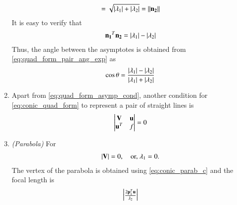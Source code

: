 \begin{enumerate}[label=\thesubsection.\arabic*.,ref=\thesubsection.\theenumi]
\begin{align}
=\sqrt{\left\vert\lambda_1\right\vert+\left\vert\lambda_2\right\vert} = \left\lVert\mathbf{n_2}\right\rVert
\end{align} 
It is easy to verify that 
\begin{align} 
\mathbf{n_1}^T\mathbf{n_2} = \left\vert\lambda_1\right\vert-\left\vert\lambda_2\right\vert
\end{align} 
%
Thus, the angle between the asymptotes is obtained from \eqref{eq:quad_form_pair_ang_exp} as
\begin{align} 
\label{eq:quad_form_pair_ang}
\cos\theta=\frac{\left\vert\lambda_1\right\vert-\left\vert\lambda_2\right\vert}
{\left\vert\lambda_1\right\vert+\left\vert\lambda_2\right\vert}
\end{align} 
%
\item Apart from \eqref{eq:quad_form_asymp_cond}, another condition for \eqref{eq:conic_quad_form} to represent a pair of straight lines is
\begin{align}
\begin{vmatrix}
\mathbf{V}&\mathbf{u}
\\
\mathbf{u}^T&f
\end{vmatrix}
= 0
\label{eq:quad_forms_pair_det}
\end{align}
%


\item {\em (Parabola)} For \begin{align} \left\vert\mathbf{V}\right\vert 
= 0, \quad \text{or, } \lambda_1 = 0. \end{align}
The vertex of the parabola  is  obtained using \eqref{eq:conic_parab_c} and the focal length is 
\begin{align}
\begin{vmatrix}\frac{2\mathbf{p}_1^T\mathbf{u}}{\lambda_2}\end{vmatrix}
\end{align}

\end{enumerate}

